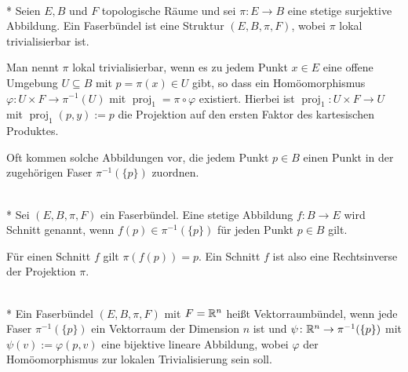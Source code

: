 \begin{definition}[Faserbündel]\mbox{}\\*
Seien $E,B$ und $F$ topologische Räume und sei $\pi\colon E\to B$
eine stetige surjektive Abbildung. Ein Faserbündel ist eine Struktur
$(E,B,\pi,F)$, wobei $\pi$ lokal trivialisierbar ist.

Man nennt $\pi$ lokal trivialisierbar,
wenn es zu jedem Punkt $x\in E$ eine offene Umgebung
$U\subseteq B$ mit $p=\pi(x)\in U$ gibt,
so dass ein Homöomorphismus $\varphi\colon U\times F\to\pi^{-1}(U)$
mit $\operatorname{proj}_1 = \pi\circ\varphi$ existiert. Hierbei
ist $\operatorname{proj}_1\colon U\times F\to U$ mit
$\operatorname{proj}_1(p,y):=p$ die Projektion auf den ersten Faktor
des kartesischen Produktes.
\end{definition}

\noindent
Oft kommen solche Abbildungen vor, die jedem Punkt $p\in B$ einen Punkt
in der zugehörigen Faser $\pi^{-1}(\{p\})$ zuordnen.

\begin{definition}[Schnitt]\mbox{}\\*
Sei $(E,B,\pi,F)$ ein Faserbündel. Eine stetige Abbildung
$f\colon B\to E$ wird Schnitt genannt, wenn $f(p)\in\pi^{-1}(\{p\})$
für jeden Punkt $p\in B$ gilt.
\end{definition}

\noindent
Für einen Schnitt $f$ gilt $\pi(f(p))=p$. Ein Schnitt $f$ ist also eine
Rechtsinverse der Projektion $\pi$.

\begin{definition}[Vektorraumbündel]\mbox{}\\*
Ein Faserbündel $(E,B,\pi,F)$ mit $F=\mathbb R^n$ heißt Vektorraumbündel, wenn
jede Faser $\pi^{-1}(\{p\})$ ein Vektorraum der Dimension $n$ ist und
$\psi\colon\mathbb R^n\to\pi^{-1}(\{p\})$ mit $\psi(v):=\varphi(p,v)$
eine bijektive lineare Abbildung, wobei $\varphi$ der Homöomorphismus
zur lokalen Trivialisierung sein soll.
\end{definition}

